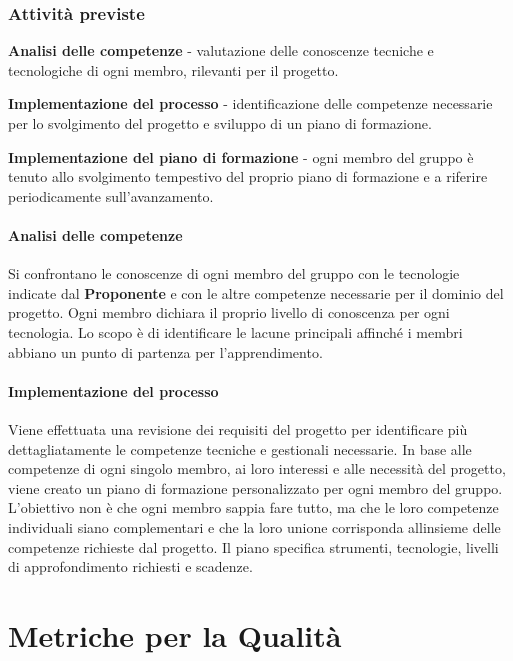 \documentclass[12pt, a4paper]{article}
\begin{document}
 \subsubsection{Attività previste}

\textbf{Analisi delle competenze} - valutazione delle conoscenze tecniche e tecnologiche di ogni membro, rilevanti per il progetto.

 \textbf{Implementazione del processo} - identificazione delle competenze necessarie per lo svolgimento del progetto e sviluppo di un piano di formazione.
 
 \textbf{Implementazione del piano di formazione} - ogni membro del gruppo è tenuto allo svolgimento tempestivo del proprio piano di formazione e a riferire periodicamente sull'avanzamento.

 \paragraph{Analisi delle competenze}

Si confrontano le conoscenze di ogni membro del gruppo con le tecnologie indicate dal \textbf{Proponente} e con le altre competenze necessarie per il dominio del progetto. Ogni membro dichiara il proprio livello di conoscenza per ogni tecnologia. Lo scopo è di identificare le lacune principali affinché i membri abbiano un punto di partenza per l'apprendimento.

 \paragraph{Implementazione del processo}

Viene effettuata una revisione dei requisiti del progetto per identificare più dettagliatamente le competenze tecniche e gestionali necessarie. In base alle competenze di ogni singolo membro, ai loro interessi e alle necessità del progetto, viene creato un piano di formazione personalizzato per ogni membro del gruppo. L'obiettivo non è che ogni membro sappia fare tutto, ma che le loro competenze individuali siano complementari e che la loro unione corrisponda all\textquotesingle insieme delle competenze richieste dal progetto. Il piano specifica strumenti, tecnologie, livelli di approfondimento richiesti e scadenze.


\newpage
\section{Metriche per la Qualità}
\end{document}
